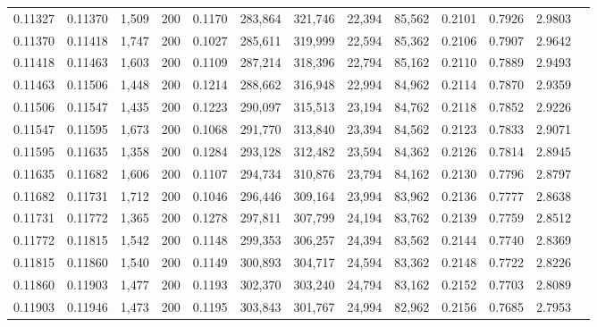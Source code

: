 \begin{tabular}{rrrrrrrrrrrrr}
0.11327 & 0.11370 & 1,509 & 200 &                                     0.1170 & 283,864 & 321,746 &  22,394 &  85,562 & 0.2101 & 0.7926 & 2.9803 \\
0.11370 & 0.11418 & 1,747 & 200 &                                     0.1027 & 285,611 & 319,999 &  22,594 &  85,362 & 0.2106 & 0.7907 & 2.9642 \\
0.11418 & 0.11463 & 1,603 & 200 &                                     0.1109 & 287,214 & 318,396 &  22,794 &  85,162 & 0.2110 & 0.7889 & 2.9493 \\
0.11463 & 0.11506 & 1,448 & 200 &                                     0.1214 & 288,662 & 316,948 &  22,994 &  84,962 & 0.2114 & 0.7870 & 2.9359 \\
0.11506 & 0.11547 & 1,435 & 200 &                                     0.1223 & 290,097 & 315,513 &  23,194 &  84,762 & 0.2118 & 0.7852 & 2.9226 \\
0.11547 & 0.11595 & 1,673 & 200 &                                     0.1068 & 291,770 & 313,840 &  23,394 &  84,562 & 0.2123 & 0.7833 & 2.9071 \\
0.11595 & 0.11635 & 1,358 & 200 &                                     0.1284 & 293,128 & 312,482 &  23,594 &  84,362 & 0.2126 & 0.7814 & 2.8945 \\
0.11635 & 0.11682 & 1,606 & 200 &                                     0.1107 & 294,734 & 310,876 &  23,794 &  84,162 & 0.2130 & 0.7796 & 2.8797 \\
0.11682 & 0.11731 & 1,712 & 200 &                                     0.1046 & 296,446 & 309,164 &  23,994 &  83,962 & 0.2136 & 0.7777 & 2.8638 \\
0.11731 & 0.11772 & 1,365 & 200 &                                     0.1278 & 297,811 & 307,799 &  24,194 &  83,762 & 0.2139 & 0.7759 & 2.8512 \\
0.11772 & 0.11815 & 1,542 & 200 &                                     0.1148 & 299,353 & 306,257 &  24,394 &  83,562 & 0.2144 & 0.7740 & 2.8369 \\
0.11815 & 0.11860 & 1,540 & 200 &                                     0.1149 & 300,893 & 304,717 &  24,594 &  83,362 & 0.2148 & 0.7722 & 2.8226 \\
0.11860 & 0.11903 & 1,477 & 200 &                                     0.1193 & 302,370 & 303,240 &  24,794 &  83,162 & 0.2152 & 0.7703 & 2.8089 \\
0.11903 & 0.11946 & 1,473 & 200 &                                     0.1195 & 303,843 & 301,767 &  24,994 &  82,962 & 0.2156 & 0.7685 & 2.7953 \\

\end{tabular}
